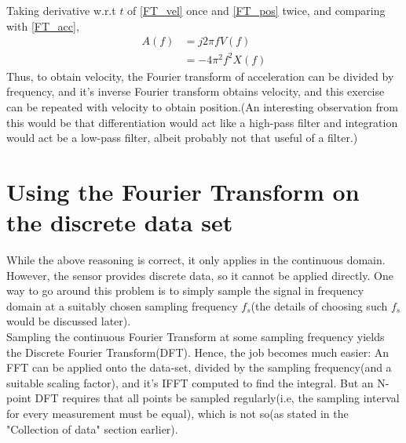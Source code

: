 \documentclass[oneside]{book}
\begin{document}
Taking derivative w.r.t $t$ of \eqref{FT_vel} once and \eqref{FT_pos} twice, and comparing with \eqref{FT_acc},
\begin{align}
    A(f) &= j2 \pi f  V(f)\\
    &= -4 \pi^2 f^2  X(f)
\end{align}
Thus, to obtain velocity, the Fourier transform of acceleration can be divided by frequency, and it's inverse Fourier transform obtains velocity, and this exercise can be repeated with velocity to obtain position.(An interesting observation from this would be that differentiation would act like a high-pass filter and integration would act be a low-pass filter, albeit probably not that useful of a filter.)\\
\newpage
\chapter{Using the Fourier Transform on the discrete data set}
While the above reasoning is correct, it only applies in the continuous domain. However, the sensor provides discrete data, so it cannot be applied directly. One way to go around this problem is to simply sample the signal in frequency domain at a suitably chosen sampling frequency $f_s$(the details of choosing such $f_s$ would be discussed later). \\
Sampling the continuous Fourier Transform at some sampling frequency yields the Discrete Fourier Transform(DFT). Hence, the job becomes much easier: An FFT can be applied onto the data-set, divided by the sampling frequency(and a suitable scaling factor), and it's IFFT computed to find the integral. But an N-point DFT requires that all points be sampled regularly(i.e, the sampling interval for every measurement must be equal), which is not so(as stated in the "Collection of data" section earlier).
\end{document}
